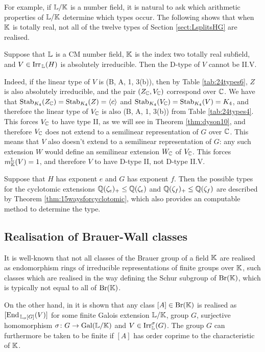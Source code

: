For example, if ${\mathbb L} / {\mathbb K}$ is a number field, it is natural to ask which arithmetic properties of ${\mathbb L} / {\mathbb K}$ determine which types occur. The following shows that when ${\mathbb K}$ is totally real, not all of the twelve types of Section \ref{sect:LsplitsHG} are realised.

\begin{eg}
Suppose that ${\mathbb L}$ is a CM number field, ${\mathbb K}$ is the index two totally real subfield, and $V \in \operatorname{Irr}_{\, {\mathbb L}}(H)$ is absolutely irreducible. Then the D-type of $V$ cannot be II.V.

Indeed, if the linear type of $V$ is (B, A, 1, 3(b)), then by Table \ref{tab:24types6}, $Z$ is also absolutely irreducible, and the pair $(Z_{{\mathbb C}}, V_{{\mathbb C}})$ correspond over ${\mathbb C}$. We have that $\operatorname{Stab}_{K_4}(Z_{{\mathbb C}}) = \operatorname{Stab}_{K_4}(Z) = \langle c \rangle$ and $\operatorname{Stab}_{K_4}(V_{{\mathbb C}}) = \operatorname{Stab}_{K_4}(V) = K_4$, and therefore the linear type of $V_{{\mathbb C}}$ is also (B, A, 1, 3(b)) from Table \ref{tab:24types4}. This forces $V_{{\mathbb C}}$ to have type II, as we will see in Theorem \ref{thm:dyson10}, and therefore $V_{{\mathbb C}}$ does not extend to a semilinear representation of $G$ over ${\mathbb C}$. This means that $V$ also doesn't extend to a semilinear representation of $G$: any such extension $W$ would define an semilinear extension $W_{{\mathbb C}}$ of $V_{{\mathbb C}}$. This forces $m_{{\mathbb K}}^{{\mathbb L}}(V) = 1$, and therefore $V$ to have D-type II, not D-type II.V.
\end{eg}

\begin{eg}
Suppose that $H$ has exponent $e$ and $G$ has exponent $f$. Then the possible types for the cyclotomic extensions ${\mathbb Q}(\zeta_e)_+ \leq {\mathbb Q}(\zeta_e)$ and ${\mathbb Q}(\zeta_f)_+ \leq {\mathbb Q}(\zeta_f)$ are described by Theorem \ref{thm:15waysforcyclotomic}, which also provides an computable method to determine the type.
\end{eg}

\subsection{Realisation of Brauer-Wall classes}

It is well-known that not all classes of the Brauer group of a field ${\mathbb K}$ are realised as endomorphism rings of irreducible representations of finite groups over ${\mathbb K}$, such classes which are realised in the way defining the Schur subgroup of $\operatorname{Br}({\mathbb K})$, which is typically not equal to all of $\operatorname{Br}({\mathbb K})$.

On the other hand, in \cite[\S 16]{TAYSchur} it is shown that any class $[A] \in \operatorname{Br}({\mathbb K})$ is realised as $[\operatorname{End}_{\, {\mathbb L}_{\sigma}[G]}(V)]$ for some finite Galois extension ${\mathbb L} / {\mathbb K}$, group $G$, surjective homomorphism $\sigma \colon G \rightarrow \operatorname{Gal}({\mathbb L} / {\mathbb K})$ and $V \in \operatorname{Irr}_{{\mathbb L}}^{\sigma}(G)$. The group $G$ can furthermore be taken to be finite if $[A]$ has order coprime to the characteristic of ${\mathbb K}$. 

